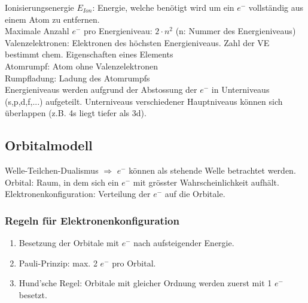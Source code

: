 Ionisierungsenergie $E_{Ion}$: Energie, welche benötigt wird um ein $e^-$ vollständig aus einem Atom zu entfernen.\\

Maximale Anzahl $e^-$ pro Energieniveau: $2 \cdot n^2$ (n: Nummer des Energieniveaus) \\

Valenzelektronen: Elektronen des höchsten Energieniveaus. Zahl der VE bestimmt chem. Eigenschaften eines Elements \\
Atomrumpf: Atom ohne Valenzelektronen \\
Rumpfladung: Ladung des Atomrumpfs \\

Energieniveaus werden aufgrund der Abstossung der $e^-$ in Unterniveaus (s,p,d,f,...) aufgeteilt. Unterniveaus verschiedener Hauptniveaus können sich überlappen (z.B. 4s liegt tiefer als 3d).

\subsection{Orbitalmodell}
Welle-Teilchen-Dualismus $\Rightarrow$ $e^-$ können als stehende Welle betrachtet werden. \\

Orbital: Raum, in dem sich ein $e^-$ mit grösster Wahrscheinlichkeit aufhält. \\
Elektronenkonfiguration: Verteilung der $e^-$ auf die Orbitale. \\

\subsubsection{Regeln für Elektronenkonfiguration}
\begin{enumerate}
	\item Besetzung der Orbitale mit $e^-$ nach aufsteigender Energie.
	\item Pauli-Prinzip: max. 2 $e^-$ pro Orbital.
	\item Hund'sche Regel: Orbitale mit gleicher Ordnung werden zuerst mit 1 $e^-$ besetzt.
\end{enumerate}

